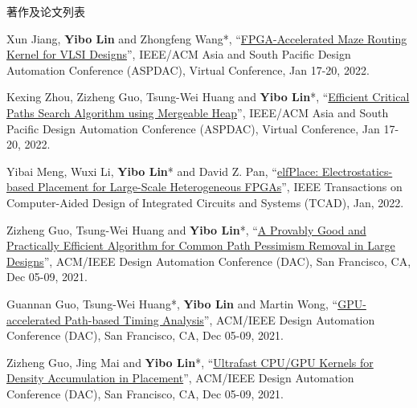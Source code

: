 \begin{rSection}{著作及论文列表}
\begin{description}[font=\normalfont, rightmargin=2em]
{}
            

\item[{[C86]}]{
        Xun Jiang, \textbf{Yibo Lin} and Zhongfeng Wang*, 
    ``\href{https://doi.org/10.1109/ASP-DAC52403.2022.9712533}{FPGA-Accelerated Maze Routing Kernel for VLSI Designs}'', 
    IEEE/ACM Asia and South Pacific Design Automation Conference (ASPDAC), Virtual Conference, Jan 17-20, 2022.
    
}
            

\item[{[C85]}]{
        Kexing Zhou, Zizheng Guo, Tsung-Wei Huang and \textbf{Yibo Lin}*, 
    ``\href{https://doi.org/10.1109/ASP-DAC52403.2022.9712566}{Efficient Critical Paths Search Algorithm using Mergeable Heap}'', 
    IEEE/ACM Asia and South Pacific Design Automation Conference (ASPDAC), Virtual Conference, Jan 17-20, 2022.
    
}
            

\item[{[J84]}]{
        Yibai Meng, Wuxi Li, \textbf{Yibo Lin}* and David Z. Pan, 
    ``\href{https://doi.org/10.1109/TCAD.2021.3053191}{elfPlace: Electrostatics-based Placement for Large-Scale Heterogeneous FPGAs}'', 
    IEEE Transactions on Computer-Aided Design of Integrated Circuits and Systems (TCAD), Jan, 2022.
    
}
            

\item[{[C83]}]{
        Zizheng Guo, Tsung-Wei Huang and \textbf{Yibo Lin}*, 
    ``\href{https://doi.org/10.1109/DAC18074.2021.9586085}{A Provably Good and Practically Efficient Algorithm for Common Path Pessimism Removal in Large Designs}'', 
    ACM/IEEE Design Automation Conference (DAC), San Francisco, CA, Dec 05-09, 2021.
    
}
            

\item[{[C82]}]{
        Guannan Guo, Tsung-Wei Huang*, \textbf{Yibo Lin} and Martin Wong, 
    ``\href{https://doi.org/10.1109/DAC18074.2021.9586316}{GPU-accelerated Path-based Timing Analysis}'', 
    ACM/IEEE Design Automation Conference (DAC), San Francisco, CA, Dec 05-09, 2021.
    
}
            

\item[{[C81]}]{
        Zizheng Guo, Jing Mai and \textbf{Yibo Lin}*, 
    ``\href{https://doi.org/10.1109/DAC18074.2021.9586149}{Ultrafast CPU/GPU Kernels for Density Accumulation in Placement}'', 
    ACM/IEEE Design Automation Conference (DAC), San Francisco, CA, Dec 05-09, 2021.
    
}
\end{description}
\end{rSection}

